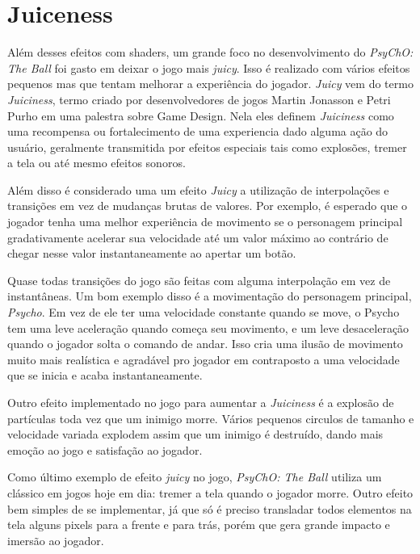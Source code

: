 \section{Juiceness}
\label{sec:juiceness}

Além desses efeitos com shaders, um grande foco no desenvolvimento do \textit{PsyChO: The Ball} foi gasto em deixar o jogo mais \textit{juicy}. Isso é realizado com vários efeitos pequenos mas que tentam melhorar a experiência do jogador. \textit{Juicy} vem do termo \textit{Juiciness}, termo criado por desenvolvedores de jogos Martin Jonasson e Petri Purho em uma palestra sobre Game Design\cite{martinpetri}. Nela eles definem \textit{Juiciness} como uma recompensa ou fortalecimento de uma experiencia dado alguma ação do usuário, geralmente transmitida por efeitos especiais tais como explosões, tremer a tela ou até mesmo efeitos sonoros.

Além disso é considerado uma um efeito \textit{Juicy} a utilização de interpolações e transições em vez de mudanças brutas de valores. Por exemplo, é esperado que o jogador tenha uma melhor experiência de movimento se o personagem principal gradativamente acelerar sua velocidade até um valor máximo ao contrário de chegar nesse valor instantaneamente ao apertar um botão.

Quase todas transições do jogo são feitas com alguma interpolação em vez de instantâneas. Um bom exemplo disso é a movimentação do personagem principal, \textit{Psycho}. Em vez de ele ter uma velocidade constante quando se move, o Psycho tem uma leve aceleração quando começa seu movimento, e um leve desaceleração quando o jogador solta o comando de andar. Isso cria uma ilusão de movimento muito mais realística e agradável pro jogador em contraposto a uma velocidade que se inicia e acaba instantaneamente.

Outro efeito implementado no jogo para aumentar a \textit{Juiciness} é a explosão de partículas toda vez que um inimigo morre. Vários pequenos circulos de tamanho e velocidade variada explodem assim que um inimigo é destruído, dando mais emoção ao jogo e satisfação ao jogador.

Como último exemplo de efeito \textit{juicy} no jogo, \textit{PsyChO: The Ball} utiliza um clássico em jogos hoje em dia: tremer a tela quando o jogador morre. Outro efeito bem simples de se implementar, já que só é preciso transladar todos elementos na tela alguns pixels para a frente e para trás, porém que gera grande impacto e imersão ao jogador.

